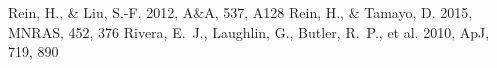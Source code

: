 \documentclass[RNAAS]{aastex631}
\begin{document}
\begin{thebibliography}{}
 Rein, H., \& Liu, S.-F. 2012, A\&A, 537, A128
 Rein, H., \& Tamayo, D. 2015, MNRAS, 452, 376
 Rivera, E.~J., Laughlin, G., Butler, R.~P., et al. 2010, ApJ, 719, 890
\end{thebibliography}
\end{document}
